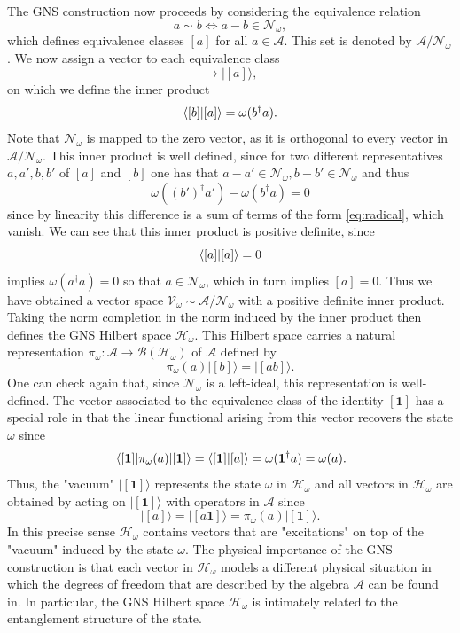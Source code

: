 \documentclass[aps,pra,reprint,superscriptaddress]{revtex4-2}
\newcommand{\cA}{{\mathcal A}}
\newcommand{\cB}{{\mathcal B}}
\newcommand{\cH}{{\mathcal H}}
\newcommand{\cN}{{\mathcal N}}
\newcommand{\cV}{{\mathcal V}}
\newcommand\w{\omega}
\newcommand{\id}{\mathbf 1}
\providecommand{\ket}[1]{\lvert #1\rangle}
\theoremstyle{definition}
\theoremstyle{remark}
\begin{document}
The GNS construction now proceeds by considering the equivalence relation 
\begin{equation}
    a \sim b \Leftrightarrow a - b \in \cN_\w, 
\end{equation}
which defines equivalence classes $[a]$ for all $a \in \cA$. This set is
denoted by $\cA/\cN_\w$. We now assign a
vector to each equivalence class
\begin{equation}
    [a] \mapsto \ket{[a]},
\end{equation}
on which we define the inner product
\begin{equation}
    \braket{[b]}{[a]} = \w(b^\dagger a).
\end{equation}
Note that $\cN_\w$ is mapped to the zero vector, as it is orthogonal to every
vector in $\cA / \cN_\w$.
This inner product is well defined, since for two different representatives
$a,a',b,b'$ of $[a]$ and $[b]$ one has that $a - a' \in \cN_\w, b-b' \in
\cN_\w$ and thus
\begin{equation}
    \w((b')^\dagger a') - \w(b^\dagger a) = 0
\end{equation}
since by linearity this difference is a sum of terms of the form
\eqref{eq:radical}, which vanish. 
We can see that this inner product is
positive definite, since 
\begin{equation}
    \braket{[a]}{[a]} = 0
\end{equation}
implies $\w(a^\dagger a) = 0$ so that $a \in \cN_\w$, which in turn implies $[a] = 0$.
Thus we have obtained a vector space $\cV_\w \sim \cA/\cN_\w$ with a
positive definite inner product. Taking the norm completion in the norm induced
by the inner product then defines the GNS Hilbert space $\cH_\w$. 
This Hilbert space carries a natural representation $\pi_\w: \cA \rightarrow
\cB(\cH_\w)$ of $\cA$ defined by
\begin{equation}
    \pi_\w(a) \ket{[b]} = \ket{[ab]}.
\end{equation}
One can check again that, since $\cN_\w$ is a left-ideal, this representation
is well-defined. The vector associated to the equivalence class of the identity
$[\id]$ has a special role in that the linear functional arising from this vector recovers the state $\w$ since 
\begin{equation}
    \mel{[\id]}{\pi_\w(a)}{[\id]} = \braket{[\id]}{[a]} = \w(\id^\dagger a) =
    \w(a).
\end{equation}
Thus, the "vacuum" $\ket{[\id]}$ represents the state $\w$ in $\cH_\w$ and all
vectors in $\cH_\w$ are obtained by acting on $\ket{[\id]}$ with operators in
$\cA$ since 
\begin{equation}
    \ket{[a]} = \ket{[a \id]} = \pi_\w(a) \ket{[\id]}.
\end{equation}
In this precise sense $\cH_\w$ contains vectors that are "excitations" on top
of the "vacuum" induced by the state $\w$.
The physical importance of the GNS construction is that each vector in $\cH_\w$ models a
different physical situation in which the degrees of freedom that are described
by the algebra $\cA$ can be found in. In particular, the GNS Hilbert space
$\cH_\w$ is intimately related to the entanglement structure of the state. 
\end{document}
